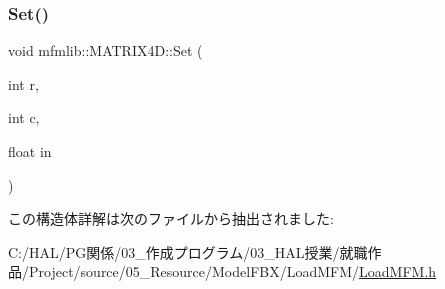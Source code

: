 \subsubsection{\texorpdfstring{Set()}{Set()}}
{\footnotesize\ttfamily void mfmlib\+::\+M\+A\+T\+R\+I\+X4\+D\+::\+Set (\begin{DoxyParamCaption}\item[{int}]{r,  }\item[{int}]{c,  }\item[{float}]{in }\end{DoxyParamCaption})\hspace{0.3cm}{\ttfamily [inline]}}



この構造体詳解は次のファイルから抽出されました\+:\begin{DoxyCompactItemize}
\item 
C\+:/\+H\+A\+L/\+P\+G関係/03\+\_\+作成プログラム/03\+\_\+\+H\+A\+L授業/就職作品/\+Project/source/05\+\_\+\+Resource/\+Model\+F\+B\+X/\+Load\+M\+F\+M/\mbox{\hyperlink{_load_m_f_m_8h}{Load\+M\+F\+M.\+h}}\end{DoxyCompactItemize}

